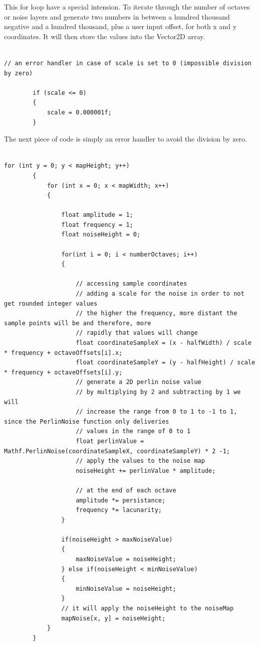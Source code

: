\documentclass[a4paper,12pt]{book}
\begin{document}
This for loop have a special intension. To iterate through the number of octaves or noise layers and generate two numbers in between a hundred thousand negative and a hundred thousand, plus a user input offset, for both x and y coordinates. It will then store the values into the Vector2D array. 

\begin{lstlisting}

// an error handler in case of scale is set to 0 (impossible division by zero)

        if (scale <= 0)
        {
            scale = 0.000001f;
        }

\end{lstlisting}

The next piece of code is simply an error handler to avoid the division by zero.


\begin{lstlisting}

for (int y = 0; y < mapHeight; y++)
        {
            for (int x = 0; x < mapWidth; x++)
            {

                float amplitude = 1;
                float frequency = 1;
                float noiseHeight = 0;

                for(int i = 0; i < numberOctaves; i++)
                {

                    // accessing sample coordinates
                    // adding a scale for the noise in order to not get rounded integer values
                    // the higher the frequency, more distant the sample points will be and therefore, more
                    // rapidly that values will change
                    float coordinateSampleX = (x - halfWidth) / scale * frequency + octaveOffsets[i].x;
                    float coordinateSampleY = (y - halfHeight) / scale * frequency + octaveOffsets[i].y; 
                    // generate a 2D perlin noise value
                    // by multiplying by 2 and subtracting by 1 we will
                    // increase the range from 0 to 1 to -1 to 1, since the PerlinNoise function only deliveries
                    // values in the range of 0 to 1
                    float perlinValue = Mathf.PerlinNoise(coordinateSampleX, coordinateSampleY) * 2 -1;
                    // apply the values to the noise map
                    noiseHeight += perlinValue * amplitude;

                    // at the end of each octave
                    amplitude *= persistance;
                    frequency *= lacunarity;
                }

                if(noiseHeight > maxNoiseValue)
                {
                    maxNoiseValue = noiseHeight;
                } else if(noiseHeight < minNoiseValue)
                {
                    minNoiseValue = noiseHeight;
                }
                // it will apply the noiseHeight to the noiseMap
                mapNoise[x, y] = noiseHeight;               
            }
        }

\end{lstlisting}
\end{document}
